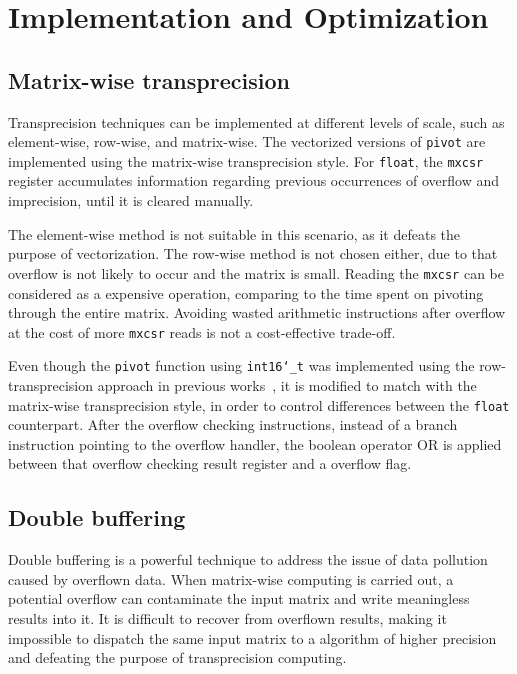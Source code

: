 \documentclass[logo,bsc,singlespacing,parskip]{infthesis}
\newcommand{\dtshort}{\texttt{int16\char`_t}}
\newcommand{\dtfloat}{\texttt{float}}
\newcommand{\mxcsr}{\texttt{mxcsr}}
\newcommand{\pivot}{\texttt{pivot}}
\begin{document}
\section{Implementation and Optimization}

\subsection{Matrix-wise transprecision}
Transprecision techniques can be implemented at different levels of scale, such
as element-wise, row-wise, and matrix-wise. The vectorized versions of \pivot{}
are implemented using the matrix-wise transprecision style. For \dtfloat{},
the \mxcsr{} register accumulates information regarding previous occurrences of
overflow and imprecision, until it is cleared manually. 

The element-wise method is not suitable in this scenario, as it defeats the
purpose of vectorization. The row-wise method is not chosen either, due to that
overflow is not likely to occur and the matrix is small. Reading the \mxcsr{}
can be considered as a expensive operation, comparing to the time spent on
pivoting through the entire matrix. Avoiding wasted arithmetic instructions
after overflow at the cost of more \mxcsr{} reads is not a cost-effective
trade-off.

Even though the \pivot{} function using \dtshort{} was implemented using the
row-transprecision approach in previous works~\cite{FPL2}, it is modified to
match with the matrix-wise transprecision style, in order to control differences
between the \dtfloat{} counterpart. After the overflow checking instructions,
instead of a branch instruction pointing to the overflow handler, the boolean
operator OR is applied between that overflow checking result register and a
overflow flag. 


\subsection{Double buffering}

Double buffering is a powerful technique to address the issue of data pollution
caused by overflown data. When matrix-wise computing is carried out, a potential
overflow can contaminate the input matrix and write meaningless results into it.
It is difficult to recover from overflown results, making it impossible to
dispatch the same input matrix to a algorithm of higher precision and defeating
the purpose of transprecision computing.
\end{document}
